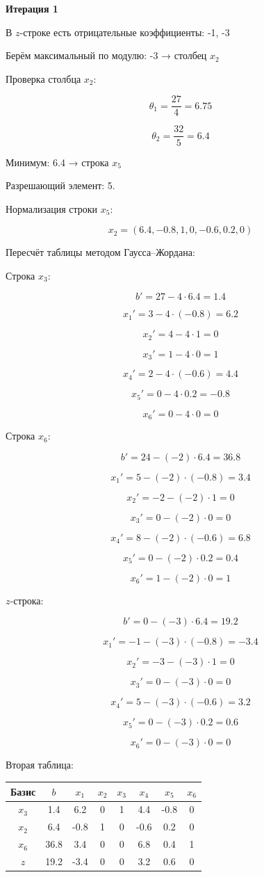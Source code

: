 \documentclass[a4paper,14pt]{extarticle}
\begin{document}
\textbf{Итерация 1}

В $z$-строке есть отрицательные коэффициенты: -1, -3

Берём максимальный по модулю: -3 → столбец $x_2$

Проверка столбца $x_2$:

\[
\theta_1=\frac{27}{4}=6.75
\]

\[
\theta_2=\frac{32}{5}=6.4
\]

Минимум: 6.4 → строка $x_5$

Разрешающий элемент: 5.

Нормализация строки $x_5$:

\[
x_2=(6.4,-0.8,1,0,-0.6,0.2,0)
\]

Пересчёт таблицы методом Гаусса–Жордана:

Строка $x_3$:

\[
b'=27-4\cdot6.4=1.4
\]

\[
x_1'=3-4\cdot(-0.8)=6.2
\]

\[
x_2'=4-4\cdot1=0
\]

\[
x_3'=1-4\cdot0=1
\]

\[
x_4'=2-4\cdot(-0.6)=4.4
\]

\[
x_5'=0-4\cdot0.2=-0.8
\]

\[
x_6'=0-4\cdot0=0
\]

Строка $x_6$:

\[
b'=24-(-2)\cdot6.4=36.8
\]

\[
x_1'=5-(-2)\cdot(-0.8)=3.4
\]

\[
x_2'=-2-(-2)\cdot1=0
\]

\[
x_3'=0-(-2)\cdot0=0
\]

\[
x_4'=8-(-2)\cdot(-0.6)=6.8
\]

\[
x_5'=0-(-2)\cdot0.2=0.4
\]

\[
x_6'=1-(-2)\cdot0=1
\]

$z$-строка:

\[
b'=0-(-3)\cdot6.4=19.2
\]

\[
x_1'=-1-(-3)\cdot(-0.8)=-3.4
\]

\[
x_2'=-3-(-3)\cdot1=0
\]

\[
x_3'=0-(-3)\cdot0=0
\]

\[
x_4'=5-(-3)\cdot(-0.6)=3.2
\]

\[
x_5'=0-(-3)\cdot0.2=0.6
\]

\[
x_6'=0-(-3)\cdot0=0
\]

Вторая таблица:

\begin{center}
\begin{tabular}{|c|c|c|c|c|c|c|c|}
\hline
Базис & $b$ & $x_1$ & $x_2$ & $x_3$ & $x_4$ & $x_5$ & $x_6$ \\
\hline
$x_3$ & 1.4 & 6.2 & 0 & 1 & 4.4 & -0.8 & 0 \\
\hline
$x_2$ & 6.4 & -0.8 & 1 & 0 & -0.6 & 0.2 & 0 \\
\hline
$x_6$ & 36.8 & 3.4 & 0 & 0 & 6.8 & 0.4 & 1 \\
\hline
$z$ & 19.2 & -3.4 & 0 & 0 & 3.2 & 0.6 & 0 \\
\hline
\end{tabular}
\end{center}
\end{document}
